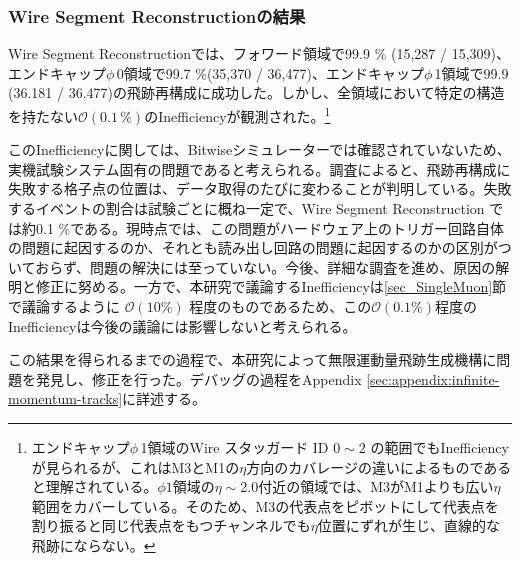 \subsubsection*{Wire Segment Reconstructionの結果}
Wire Segment Reconstructionでは、フォワード領域で99.9 \% (15,287 / 15,309)、エンドキャップ$\phi\,$0領域で99.7 \%(35,370 / 36,477)、エンドキャップ$\phi\,$1領域で99.9 (36.181 / 36.477)の飛跡再構成に成功した。しかし、全領域において特定の構造を持たない$\mathcal{O}(0.1\,\%)$のInefficiencyが観測された。\footnote{エンドキャップ$\phi\,$1領域のWire スタッガード ID $0 \sim 2$ の範囲でもInefficiencyが見られるが、これはM3とM1の$\eta$方向のカバレージの違いによるものであると理解されている。$\phi1$領域の$\eta\sim$2.0付近の領域では、M3がM1よりも広い$\eta$範囲をカバーしている。そのため、M3の代表点をピボットにして代表点を割り振ると同じ代表点をもつチャンネルでも$\eta$位置にずれが生じ、直線的な飛跡にならない。
}

このInefficiencyに関しては、Bitwiseシミュレーターでは確認されていないため、実機試験システム固有の問題であると考えられる。調査によると、飛跡再構成に失敗する格子点の位置は、データ取得のたびに変わることが判明している。失敗するイベントの割合は試験ごとに概ね一定で、Wire Segment Reconstruction では約0.1 \%である。現時点では、この問題がハードウェア上のトリガー回路自体の問題に起因するのか、それとも読み出し回路の問題に起因するのかの区別がついておらず、問題の解決には至っていない。今後、詳細な調査を進め、原因の解明と修正に努める。一方で、本研究で議論するInefficiencyは\ref{sec_SingleMuon}節で議論するように $\mathcal{O}(10 \%)$ 程度のものであるため、この$\mathcal{O}(0.1 \%)$程度のInefficiencyは今後の議論には影響しないと考えられる。

この結果を得られるまでの過程で、本研究によって無限運動量飛跡生成機構に問題を発見し、修正を行った。デバッグの過程をAppendix \ref{sec:appendix:infinite-momentum-tracks}に詳述する。

